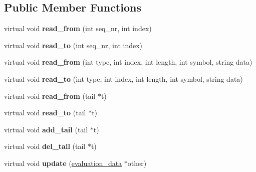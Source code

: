 \subsection*{Public Member Functions}
\begin{DoxyCompactItemize}
\item 
\mbox{\label{classevaluation__data_a84f1de18f3ad5c25ebc8606da0f27395}} 
virtual void {\bfseries read\+\_\+from} (int seq\+\_\+nr, int index)
\item 
\mbox{\label{classevaluation__data_a395e202536ed0a56a55cf269c3bcbb50}} 
virtual void {\bfseries read\+\_\+to} (int seq\+\_\+nr, int index)
\item 
\mbox{\label{classevaluation__data_ad4774370fe02a3daadfe4b2aed447ac5}} 
virtual void {\bfseries read\+\_\+from} (int type, int index, int length, int symbol, string data)
\item 
\mbox{\label{classevaluation__data_aff5dc3181ecf1391840b9193715dc229}} 
virtual void {\bfseries read\+\_\+to} (int type, int index, int length, int symbol, string data)
\item 
\mbox{\label{classevaluation__data_ac0d4cc2f607c2ca81ac2d6dad6499515}} 
virtual void {\bfseries read\+\_\+from} (tail $\ast$t)
\item 
\mbox{\label{classevaluation__data_afefa2054b31ebd85b1627c485e575f67}} 
virtual void {\bfseries read\+\_\+to} (tail $\ast$t)
\item 
\mbox{\label{classevaluation__data_a7dedf0b283e5a2909cebe0378ad04ba5}} 
virtual void {\bfseries add\+\_\+tail} (tail $\ast$t)
\item 
\mbox{\label{classevaluation__data_a9df616044301b03b6776999ff08f2a94}} 
virtual void {\bfseries del\+\_\+tail} (tail $\ast$t)
\item 
\mbox{\label{classevaluation__data_a863d6fd9eb36651639f0879af3262d5c}} 
virtual void {\bfseries update} (\hyperlink{classevaluation__data}{evaluation\+\_\+data} $\ast$other)

\end{DoxyCompactItemize}
